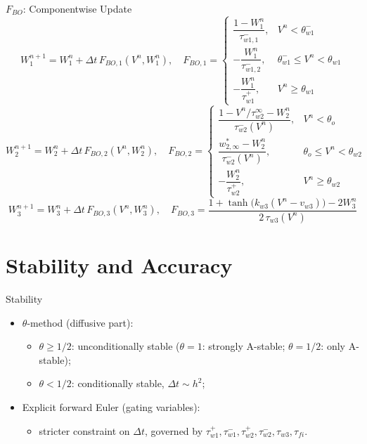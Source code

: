 \documentclass{beamer}
\begin{document}
\begin{frame}{$F_{BO}$: Componentwise Update}
\footnotesize
\[
W_1^{n+1} = W_1^n + \Delta t\, F_{BO,1}(V^n,W_1^n), \quad
F_{BO,1} =
\begin{cases}
\dfrac{1-W_1^n}{\tau^-_{w1,1}}, & V^n < \theta^-_{w1} \\[4pt]
-\dfrac{W_1^n}{\tau^-_{w1,2}}, & \theta^-_{w1} \le V^n < \theta_{w1} \\[4pt]
-\dfrac{W_1^n}{\tau^+_{w1}}, & V^n \ge \theta_{w1}
\end{cases}
\]
\[
W_2^{n+1} = W_2^n + \Delta t\, F_{BO,2}(V^n,W_2^n), \quad
F_{BO,2} =
\begin{cases}
\dfrac{1-V^n/\tau^\infty_{w2}-W_2^n}{\tau^-_{w2}(V^n)}, & V^n < \theta_o \\[4pt]
\dfrac{w^*_{2,\infty}-W_2^n}{\tau^-_{w2}(V^n)}, & \theta_o \le V^n < \theta_{w2} \\[4pt]
-\dfrac{W_2^n}{\tau^+_{w2}}, & V^n \ge \theta_{w2}
\end{cases}
\]
\[
W_3^{n+1} = W_3^n + \Delta t\, F_{BO,3}(V^n,W_3^n), \quad
F_{BO,3} = \frac{1+\tanh\big(k_{w3}(V^n-v_{w3})\big) - 2W_3^n}{2\,\tau_{w3}(V^n)}
\]
\end{frame}



\section{Stability and Accuracy}

\begin{frame}{Stability}
\begin{itemize}
  \item $\theta$-method (diffusive part):
  \begin{itemize}
    \item $\theta\ge 1/2$: unconditionally stable
      ($\theta=1$: strongly A-stable; $\theta=1/2$: only A-stable);
    \item $\theta<1/2$: conditionally stable, $\Delta t \sim h^2$;
  \end{itemize}
  \item Explicit forward Euler (gating variables):
  \begin{itemize}
    \item stricter constraint on $\Delta t$, governed by
      $\tau^+_{w1},\tau^-_{w1},\tau^+_{w2},\tau^-_{w2},\tau_{w3},\tau_{fi}$.
  \end{itemize}
\end{itemize}
\end{frame}
\end{document}
